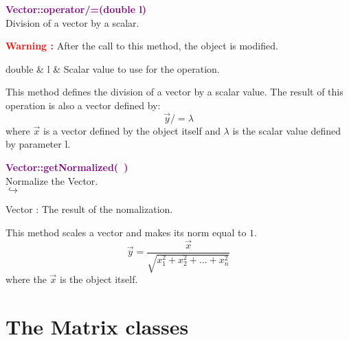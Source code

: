 \textcolor{purple}{\textbf{Vector::operator/=(double l)}}\label{Vector::operator/=(double l)}\\
Division of a vector by a scalar.

\hspace*{10mm}\textcolor{red}{\textbf{Warning :}} After the call to this method, the object is modified.

\begin{tcolorbox}[width=\textwidth,myArgs,tabularx={ll|R}]
double & l & Scalar value to use for the operation.
\end{tcolorbox}

This method defines the division of a vector by a scalar value.
The result of this operation is also a vector defined by:
\begin{equation*}
\overrightarrow{y} /= \lambda
\end{equation*}
where $\overrightarrow{x}$ is a vector defined by the object itself and $\lambda$ is the scalar value defined by parameter l.

\textcolor{purple}{\textbf{Vector::getNormalized(~)}}\label{Vector::getNormalized()}\\
Normalize the Vector.\\ \hspace*{5mm}$\hookrightarrow$
\vspace*{-2em}\begin{tcolorbox}[grow to left by=-1cm, width=\textwidth-1cm,myArgs,tabularx={l|R}]
 Vector : The result of the nomalization.
\end{tcolorbox}

This method scales a vector and makes its norm equal to $1$.
\begin{equation*}
\overrightarrow{y} = \frac{\overrightarrow{x}}{\sqrt {x_{1}^2 + x_{2}^2 + ... + x_{n}^2}}
\end{equation*}
where the $\overrightarrow{x}$ is the object itself.


\section{The Matrix classes}

